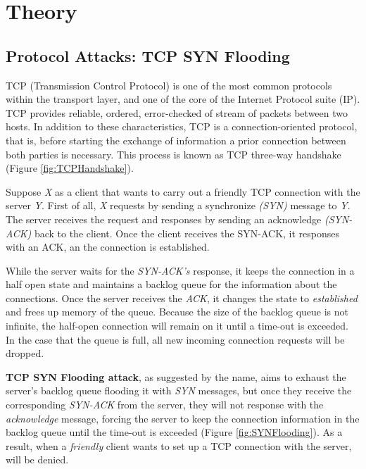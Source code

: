 

\chapter{Theory}
\label{chapter:theory}

\section{Protocol Attacks: TCP SYN Flooding}

TCP (Transmission Control Protocol) is one of the most common protocols within the transport layer, and one of the core of the Internet Protocol suite (IP). TCP provides reliable, ordered, error-checked of stream of packets between two hosts. In addition to these characteristics, TCP is a connection-oriented protocol, that is, before starting the exchange of information a prior connection between both parties is necessary. This process is known as TCP three-way handshake (Figure \ref{fig:TCPHandshake}).

\par

Suppose \textit{X} as a client that wants to carry out a friendly TCP connection with the server \textit{Y}. First of all, \textit{X} requests by sending a synchronize \textit{(SYN)} message to \textit{Y}. The server receives the request and responses by sending an acknowledge \textit{(SYN-ACK)} back to the client. Once the client receives the SYN-ACK, it responses with an ACK, an the connection is established. 

\par

While the server waits for the \textit{SYN-ACK's} response, it keeps the connection in a half open state and maintains a backlog queue for the information about the connections. Once the server receives the \textit{ACK}, it changes the state to \textit{established} and frees up memory of the queue. Because the size of the backlog queue is not infinite, the half-open connection will remain on it until a time-out is exceeded. In the case that the queue is full, all new incoming connection requests will be dropped.

\bigskip

\textbf{TCP SYN Flooding attack}, as suggested by the name, aims to exhaust the server's backlog queue flooding it with \textit{SYN} messages, but once they receive the corresponding \textit{SYN-ACK} from the server, they will not response with the \textit{acknowledge} message, forcing the server to keep the connection information in the backlog queue until the time-out is exceeded (Figure \ref{fig:SYNFlooding}). As a result, when a \textit{friendly} client wants to set up a TCP connection with the server, will be denied.


